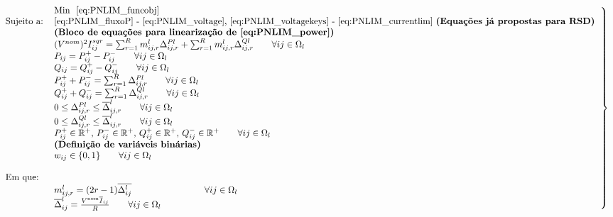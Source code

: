 \begin{tcolorbox}[breakable,pad at break*=1mm,colback=white!10,title =\textbf{Problema de PLIM para RSD}]

\begin{equation}\label{eq:plim}
\left.
    \begin{tabular}{ll}
               & Min ~\eqref{eq:PNLIM_funcobj}\\
    Sujeito a: &\eqref{eq:PNLIM_fluxoP} - \eqref{eq:PNLIM_voltage}, \eqref{eq:PNLIM_voltagekeys} - \eqref{eq:PNLIM_currentlim} \textbf{(Equações já propostas para RSD)}\\
    &\textbf{(Bloco de equações para linearização de~\eqref{eq:PNLIM_power})}\\
    &$(V^{nom})^{2}I_{ij}^{sqr} = \sum_{r = 1}^{R}m_{ij,r}^{l}\Delta_{ij,r}^{Pl} + \sum_{r = 1}^{R}m_{ij,r}^{l}\Delta_{ij,r}^{Ql} \qquad\forall ij\in\Omega_{l}$ \\
    &$P_{ij} = P_{ij}^{+} - P_{ij}^{-}\qquad\forall ij\in\Omega_{l}$\\
    &$Q_{ij} = Q_{ij}^{+} - Q_{ij}^{-}\qquad\forall ij\in\Omega_{l}$\\
    & $P_{ij}^{+} + P_{ij}^{-} = \sum_{r = 1}^{R}\Delta_{ij,r}^{Pl}  \qquad\forall ij\in\Omega_{l}$\\
    & $Q_{ij}^{+} + Q_{ij}^{-} = \sum_{r = 1}^{R}\Delta_{ij,r}^{Ql}  \qquad\forall ij\in\Omega_{l}$\\
    & $0 \leq \Delta_{ij,r}^{Pl} \leq \overline{\Delta}_{ij,r}^l \qquad\forall ij\in\Omega_{l}$\\
    & $0 \leq \Delta_{ij,r}^{Ql} \leq \overline{\Delta}_{ij,r}^l \qquad\forall ij\in\Omega_{l}$\\
    &$P_{ij}^{+}\in\mathbb{R}^{+}$, $P_{ij}^{-}\in\mathbb{R}^{+}$, $Q_{ij}^{+}\in\mathbb{R}^{+}$, $Q_{ij}^{-}\in\mathbb{R}^{+}\qquad\forall ij\in\Omega_{l}$\\
    & \textbf{(Definição de variáveis binárias)}\\
    &$w_{ij}\in\{0,1\}\qquad\forall ij\in\Omega_{l}$\\
    &\\
    Em que:&\\
    & $m_{ij,r}^{l}= (2r-1)\overline{\Delta_{ij}^{l}}\qquad\qquad\qquad\qquad\forall ij\in\Omega_{l} $\\
    & $\overline{\Delta}_{ij}^{l} = \frac{V^{\text{nom}}\overline{I}_{ij}}{R} \qquad\forall ij\in\Omega_{l}$
    \end{tabular}
\right \}
\end{equation} 
\end{tcolorbox}


